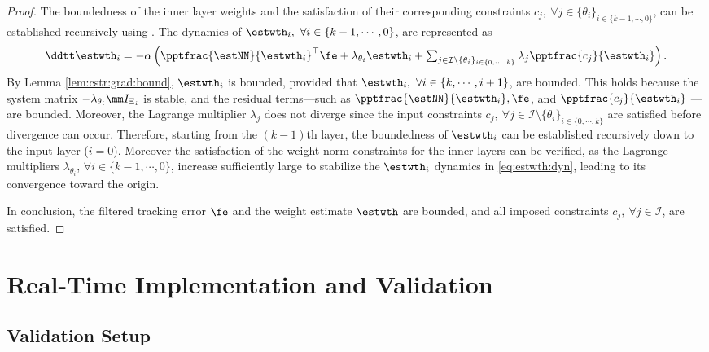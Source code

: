 \documentclass[letterpaper, journal]{IEEEtran}
\begin{document}
\begin{proof}
\hfill 

The boundedness of the inner layer weights and the satisfaction of their corresponding constraints $c_j,\ \forall j\in\{\theta_i\}_{i\in\{k-1,\cdots,0\}}$, can be established recursively using \cite[Chap.~4, Thm.~1.9]{Desoer:2009aa}.
The dynamics of $\estwth_i,\ \forall i\in\{k-1,\cdots,0\}$, are represented as
\begin{equation}
    \ddtt \estwth_i 
    =
    -\alpha
    \left(
        \pptfrac{\estNN}{\estwth_i}^\top
        \fe
        +
        \lambda_{\theta_i}\estwth_i
        +
        \textstyle\sum_{
            j\in\mathcal{I}\setminus \{\theta_i\}_{i\in\{0,\cdots,k\}}
        }
        \lambda_j
        \pptfrac{c_j}{\estwth_i}
    \right)
    .
    \label{eq:estwth:dyn}
\end{equation}
By Lemma \ref{lem:cstr:grad:bound}, $\estwth_i$ is bounded, provided that $\estwth_i,\ \forall i\in\{k,\cdots,i+1\}$, are bounded. 
This holds because the system matrix $-\lambda_{\theta_i} \mm I_{\Xi_i}$ is stable, and the residual terms—such as $\pptfrac{\estNN}{\estwth_i}, \fe$, and $\pptfrac{c_j}{\estwth_i}$ —are bounded.
Moreover, the Lagrange multiplier $\lambda_j$ does not diverge since the input constraints $c_j,\ \forall j\in\mathcal{I}\setminus \{\theta_i\}_{i\in\{0,\cdots,k\}}$ are satisfied before divergence can occur.
Therefore, starting from the $(k-1)$th layer, the boundedness of $\estwth_i$ can be established recursively down to the input layer ($i=0$).
Moreover the satisfaction of the weight norm constraints for the inner layers can be verified, as the Lagrange multipliers $\lambda_{\theta_i}$, $\forall i\in\{k-1,\cdots,0\}$, increase sufficiently large to stabilize the $\estwth_i$ dynamics in \eqref{eq:estwth:dyn}, leading to its convergence toward the origin.

\hfill

In conclusion, the filtered tracking error $\fe$ and the weight estimate $\estwth$ are bounded, and all imposed constraints $c_j,\ \forall j\in\mathcal I$, are satisfied.

\end{proof}

\section{Real-Time Implementation and Validation}\label{sec:sim}

\subsection{Validation Setup}
\end{document}
